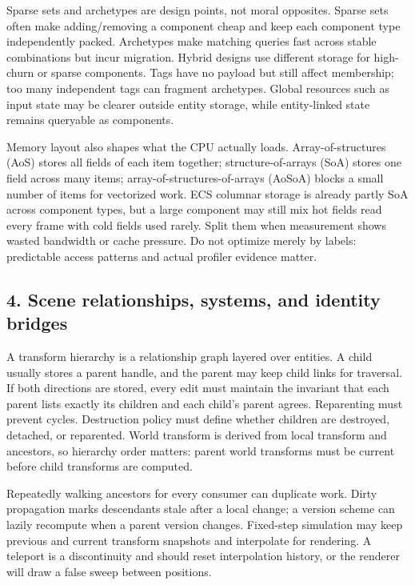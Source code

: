 Sparse sets and archetypes are design points, not moral opposites. Sparse sets often make adding/removing a component cheap and keep each component type independently packed. Archetypes make matching queries fast across stable combinations but incur migration. Hybrid designs use different storage for high-churn or sparse components. Tags have no payload but still affect membership; too many independent tags can fragment archetypes. Global resources such as input state may be clearer outside entity storage, while entity-linked state remains queryable as components.

Memory layout also shapes what the CPU actually loads. Array-of-structures (AoS) stores all fields of each item together; structure-of-arrays (SoA) stores one field across many items; array-of-structures-of-arrays (AoSoA) blocks a small number of items for vectorized work. ECS columnar storage is already partly SoA across component types, but a large component may still mix hot fields read every frame with cold fields used rarely. Split them when measurement shows wasted bandwidth or cache pressure. Do not optimize merely by labels: predictable access patterns and actual profiler evidence matter.

\subsection{4. Scene relationships, systems, and identity bridges}\label{05-engine-i-ch008-scene-relationships-systems-and-identity-bridges}

A transform hierarchy is a relationship graph layered over entities. A child usually stores a parent handle, and the parent may keep child links for traversal. If both directions are stored, every edit must maintain the invariant that each parent lists exactly its children and each child's parent agrees. Reparenting must prevent cycles. Destruction policy must define whether children are destroyed, detached, or reparented. World transform is derived from local transform and ancestors, so hierarchy order matters: parent world transforms must be current before child transforms are computed.

Repeatedly walking ancestors for every consumer can duplicate work. Dirty propagation marks descendants stale after a local change; a version scheme can lazily recompute when a parent version changes. Fixed-step simulation may keep previous and current transform snapshots and interpolate for rendering. A teleport is a discontinuity and should reset interpolation history, or the renderer will draw a false sweep between positions.


